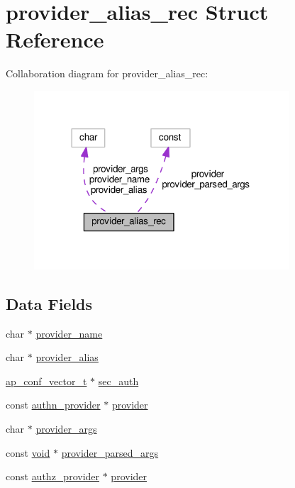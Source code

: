 \hypertarget{structprovider__alias__rec}{}\section{provider\+\_\+alias\+\_\+rec Struct Reference}
\label{structprovider__alias__rec}


Collaboration diagram for provider\+\_\+alias\+\_\+rec\+:
\nopagebreak
\begin{figure}[H]
\begin{center}
\leavevmode
\includegraphics[width=270pt]{structprovider__alias__rec__coll__graph}
\end{center}
\end{figure}
\subsection*{Data Fields}
\begin{DoxyCompactItemize}
\item 
char $\ast$ \hyperlink{structprovider__alias__rec_a490e696df2a337330b9e522601cdeb04}{provider\+\_\+name}
\item 
char $\ast$ \hyperlink{structprovider__alias__rec_af83e70c33f397576eb307df7aecb03b1}{provider\+\_\+alias}
\item 
\hyperlink{group__APACHE__CORE__CONFIG_ga614684670dbf748a70ac6bad272da59c}{ap\+\_\+conf\+\_\+vector\+\_\+t} $\ast$ \hyperlink{structprovider__alias__rec_afaa3e3e6ba9798628c7d50bd0c5b258a}{sec\+\_\+auth}
\item 
const \hyperlink{structauthn__provider}{authn\+\_\+provider} $\ast$ \hyperlink{structprovider__alias__rec_ab0152d82446e53dec9e7c72153e4cb03}{provider}
\item 
char $\ast$ \hyperlink{structprovider__alias__rec_a2792da727634341e6fe5544fe192b710}{provider\+\_\+args}
\item 
const \hyperlink{group__MOD__ISAPI_gacd6cdbf73df3d9eed42fa493d9b621a6}{void} $\ast$ \hyperlink{structprovider__alias__rec_ae8227b3adce7cacf14d60f6cf6343804}{provider\+\_\+parsed\+\_\+args}
\item 
const \hyperlink{structauthz__provider}{authz\+\_\+provider} $\ast$ \hyperlink{structprovider__alias__rec_a64cb47caa40656b0716c7c46d7e39412}{provider}
\end{DoxyCompactItemize}


